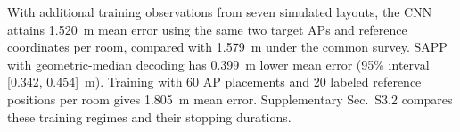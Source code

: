 With additional training observations from seven simulated layouts, the CNN attains 1.520~m mean error using the same two target APs and reference coordinates per room, compared with 1.579~m under the common survey. SAPP with geometric-median decoding has 0.399~m lower mean error (95\% interval [0.342, 0.454]~m). Training with 60 AP placements and 20 labeled reference positions per room gives 1.805~m mean error. Supplementary Sec.~S3.2 compares these training regimes and their stopping durations.
